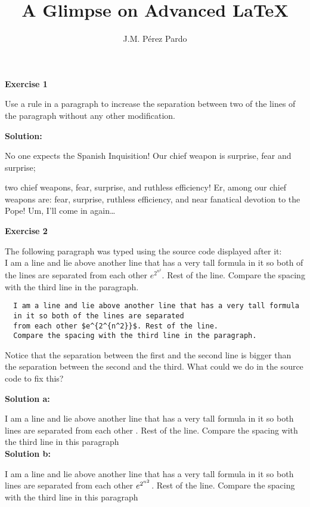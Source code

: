 \documentclass[a4paper]{article}
\title{A Glimpse on Advanced \LaTeX{}}
\author{J.M. Pérez Pardo}
\date{}
\newenvironment{exercise}[1]{%
\vspace{10pt}
\noindent\textbf{#1}\par\vspace{10pt}%
}
{%
\par\vspace{10pt}
}
\begin{document}
\begin{exercise}{Exercise 1}
Use a rule in a paragraph to increase the separation between two of the lines of the paragraph without any other modification.
\end{exercise}

\noindent \textbf{Solution:}

No one expects the Spanish Inquisition! Our chief weapon is surprise, fear and surprise;\rule{0pt}{1in} two chief weapons, fear, surprise, and ruthless efficiency! Er, among our chief weapons are: fear, surprise, ruthless efficiency, and near fanatical devotion to the Pope! Um, I'll come in again\dots




\begin{exercise}{Exercise 2}

  The following paragraph was typed using the source code displayed after it:\\
  
  I am a line and lie above another line that has a very tall formula in it so both of the lines are separated from each other $e^{2^{n^2}}$. Rest of the line. Compare the spacing with the third line in the paragraph.


  \begin{verbatim}
  I am a line and lie above another line that has a very tall formula
  in it so both of the lines are separated 
  from each other $e^{2^{n^2}}$. Rest of the line. 
  Compare the spacing with the third line in the paragraph.
  \end{verbatim}
  

Notice that the separation between the first and the second line is bigger than the separation between the second and the third. What could we do in the source code to fix this?


\end{exercise}

\noindent \textbf{Solution a:}

I am a line and lie above another line that has a very tall formula in it so both lines are separated from each other . Rest of the line. Compare the spacing with the third line in this paragraph\\


\noindent \textbf{Solution b:}

I am a line and lie above another line that has a very tall formula in it so both lines are separated from each other $e^{2^{n^{\tiny\raisebox{-1.5pt}{2}}}}$. Rest of the line. Compare the spacing with the third line in this paragraph
\end{document}
